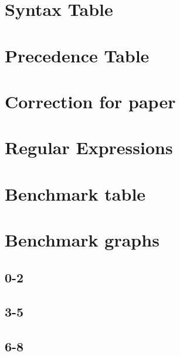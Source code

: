 \appendix

\section{Syntax Table}\label{sec:Syntax}


\section{Precedence Table}\label{sec:Precedence}


\section{Correction for paper}\label{sec:PaperCorrections}


\section{Regular Expressions}\label{sec:RegularExpressions}


\section{Benchmark table}\label{sec:BenchmarkTable}


\section{Benchmark graphs}\label{sec:BenchmarkGraphs}
\subsection{0-2}
\resizebox{\textwidth}{!}{
    
    
}
\subsection{3-5}
\resizebox{\textwidth}{!}{
    
    
}
\subsection{6-8}
\resizebox{\textwidth}{!}{
    
    
}
